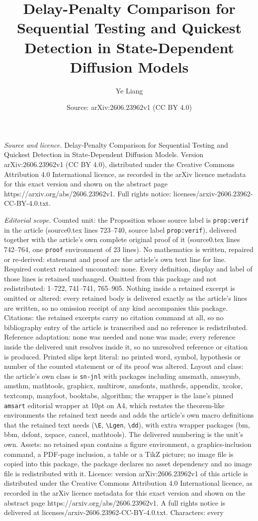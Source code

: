 \documentclass[10pt,a4paper]{amsart}
\title[Delay-Penalty Comparison for Sequential Testing and Quickest]{Delay-Penalty Comparison for Sequential Testing and Quickest Detection in State-Dependent Diffusion Models}
\author{Ye Liang}
\date{Source: arXiv:2606.23962v1 (CC BY 4.0)}
\begin{document}
\maketitle

\noindent\emph{Source and licence.} Delay-Penalty Comparison for Sequential Testing and Quickest Detection in State-Dependent Diffusion Models. Version arXiv:2606.23962v1 (CC BY 4.0), distributed under the Creative Commons Attribution 4.0 International licence, as recorded in the arXiv licence metadata for this exact version and shown on the abstract page https://arxiv.org/abs/2606.23962v1. Full rights notice: licenses/arxiv-2606.23962-CC-BY-4.0.txt.\par\smallskip

\noindent\textit{Editorial scope.} Counted unit: the Proposition whose source label is \texttt{prop:verif} in the article (source0.tex lines 723--740, source label \texttt{prop:verif}), delivered together with the article's own complete original proof of it (source0.tex lines 742--764, one \texttt{proof} environment of 23 lines). No mathematics is written, repaired or re-derived: statement and proof are the article's own text line for line. Required context retained uncounted: none. Every definition, display and label of those lines is retained unchanged. Omitted from this package and not redistributed: 1--722, 741--741, 765--905. Nothing inside a retained excerpt is omitted or altered: every retained body is delivered exactly as the article's lines are written, so no omission receipt of any kind accompanies this package. Citations: the retained excerpts carry no citation command at all, so no bibliography entry of the article is transcribed and no reference is redistributed. Reference adaptation: none was needed and none was made; every reference inside the delivered unit resolves inside it, so no unresolved reference or citation is produced. Printed slips kept literal: no printed word, symbol, hypothesis or number of the counted statement or of its proof was altered. Layout and class: the article's own class is \texttt{sn-jnl} with packages including amsmath, amssymb, amsthm, mathtools, graphicx, multirow, amsfonts, mathrsfs, appendix, xcolor, textcomp, manyfoot, booktabs, algorithm; the wrapper is the lane's pinned \texttt{amsart} editorial wrapper at 10pt on A4, which restates the theorem-like environments the retained text needs and adds the article's own macro definitions that the retained text needs (\texttt{\textbackslash E}, \texttt{\textbackslash Lgen}, \texttt{\textbackslash dd}), with extra wrapper packages (bm, bbm, dsfont, xspace, cancel, mathtools). The delivered numbering is the unit's own. Assets: no retained span contains a figure environment, a graphics-inclusion command, a PDF-page inclusion, a table or a TikZ picture; no image file is copied into this package, the package declares no asset dependency and no image file is redistributed with it. Licence: version arXiv:2606.23962v1 of this article is distributed under the Creative Commons Attribution 4.0 International licence, as recorded in the arXiv licence metadata for this exact version and shown on the abstract page https://arxiv.org/abs/2606.23962v1. A full rights notice is delivered at licenses/arxiv-2606.23962-CC-BY-4.0.txt. Characters: every 
\end{document}
